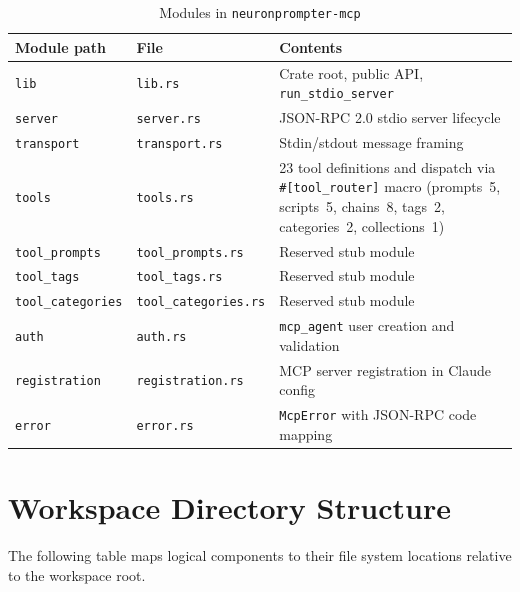 \documentclass[a4paper, 11pt, oneside]{report}
\begin{document}
\begin{table}[H]
  \centering
  \caption{Modules in \texttt{neuronprompter-mcp}}
  \label{tab:mod-mcp}
  \begin{tabularx}{\textwidth}{l l X}
    \toprule
    \textbf{Module path} & \textbf{File} & \textbf{Contents} \\
    \midrule
    \texttt{lib}              & \texttt{lib.rs}              & Crate root, public API, \texttt{run\_stdio\_server} \\
    \texttt{server}           & \texttt{server.rs}           & JSON-RPC 2.0 stdio server lifecycle \\
    \texttt{transport}        & \texttt{transport.rs}        & Stdin/stdout message framing \\
    \texttt{tools}            & \texttt{tools.rs}            & 23 tool definitions and dispatch via \texttt{\#[tool\_router]}
                                                                macro (prompts~5, scripts~5, chains~8, tags~2,
                                                                categories~2, collections~1) \\
    \texttt{tool\_prompts}    & \texttt{tool\_prompts.rs}    & Reserved stub module \\
    \texttt{tool\_tags}       & \texttt{tool\_tags.rs}       & Reserved stub module \\
    \texttt{tool\_categories} & \texttt{tool\_categories.rs} & Reserved stub module \\
    \texttt{auth}             & \texttt{auth.rs}             & \texttt{mcp\_agent} user creation and validation \\
    \texttt{registration}     & \texttt{registration.rs}     & MCP server registration in Claude config \\
    \texttt{error}            & \texttt{error.rs}            & \texttt{McpError} with JSON-RPC code mapping \\
    \bottomrule
  \end{tabularx}
\end{table}

\section{Workspace Directory Structure}
\label{sec:dir-structure}

The following table maps logical components to their file system locations
relative to the workspace root.
\end{document}
